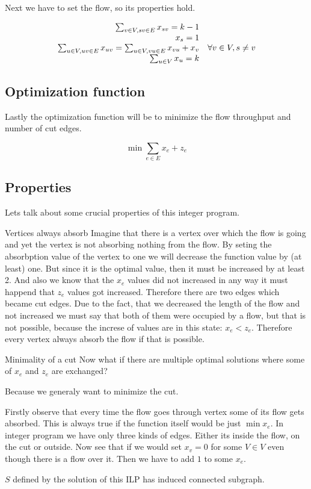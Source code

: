 \documentclass{article}
\begin{document}
	Next we have to set the flow, so its properties hold.
	
	$$
	\begin{array}{r l}
		\sum_{v \in V, sv \in E} x_{sv} = k-1 \\
		x_s = 1 \\
		\sum_{u \in V, uv \in E} x_{uv} = \sum_{u \in V, vu \in E} x_{vu} + x_v & \forall v \in V, s \neq v \\
		\sum_{u \in V} x_u = k
	\end{array}
	$$
	
	\subsection{Optimization function}
	
	Lastly the optimization function will be to minimize the flow throughput and number of cut edges.
	
	$$
	\min \sum_{e \in E} x_e + z_e
	$$
	
	\subsection{Properties}
	
	Lets talk about some crucial properties of this integer program.
		
	\begin{observation}{Vertices always absorb}
		Imagine that there is a vertex over which the flow is going and yet the vertex is not absorbing nothing from the flow. By seting the absorbption value of the vertex to one we will decrease the function value by (at least) one. But since it is the optimal value, then it must be increased by at least 2. And also we know that the $x_e$ values did not increased in any way it must happend that $z_e$ values got increased. Therefore there are two edges which became cut edges. Due to the fact, that we decreased the length of the flow and not increased we must say that both of them were occupied by a flow, but that is not possible, because the increse of values are in this state: $x_e < z_e$. Therefore every vertex always absorb the flow if that is possible.
	\end{observation}
	
	\begin{observation}{Minimality of a cut}
		Now what if there are multiple optimal solutions where some of $x_e$ and $z_e$ are exchanged?
		
		Because we generaly want to minimize the cut.
	\end{observation}
	
	\begin{todo}
		Firstly observe that every time the flow goes through vertex some of its flow gets absorbed. This is always true if the function itself would be just $\min x_e$. In integer program we have only three kinds of edges. Either its inside the flow, on the cut or outside. Now see that if we would set $x_v = 0$ for some $V \in V$ even though there is a flow over it. Then we have to add $1$ to some $x_e$.
		
		$S$ defined by the solution of this ILP has induced connected subgraph.
	\end{todo}
\end{document}
